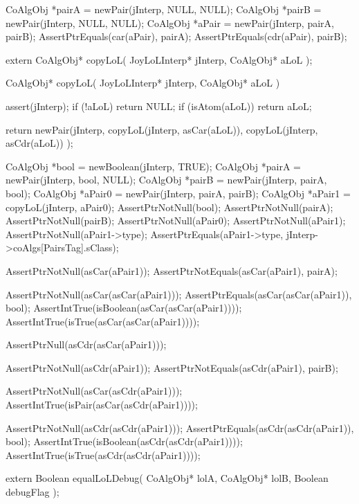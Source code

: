 \startCTest
  CoAlgObj *pairA = newPair(jInterp, NULL, NULL);
  CoAlgObj *pairB = newPair(jInterp, NULL, NULL);
  CoAlgObj *aPair = newPair(jInterp, pairA, pairB);
  AssertPtrEquals(car(aPair), pairA);
  AssertPtrEquals(cdr(aPair), pairB);
\stopCTest
\stopTestCase
\stopTestSuite

\startTestSuite[copyLoL]

\startCHeader
extern CoAlgObj* copyLoL(
  JoyLoLInterp* jInterp,
  CoAlgObj* aLoL
);
\stopCHeader

\startCCode
CoAlgObj* copyLoL(
  JoyLoLInterp* jInterp,
  CoAlgObj* aLoL
) {
  assert(jInterp);
  if (!aLoL) return NULL;
  if (isAtom(aLoL)) return aLoL;

  return newPair(jInterp,
                 copyLoL(jInterp, asCar(aLoL)),
                 copyLoL(jInterp, asCdr(aLoL))
                 );
}
\stopCCode


\startCTest
  CoAlgObj *bool   = newBoolean(jInterp, TRUE);
  CoAlgObj *pairA  = newPair(jInterp, bool, NULL);
  CoAlgObj *pairB  = newPair(jInterp, pairA, bool);
  CoAlgObj *aPair0 = newPair(jInterp, pairA, pairB);
  CoAlgObj *aPair1 = copyLoL(jInterp, aPair0);
  AssertPtrNotNull(bool);
  AssertPtrNotNull(pairA);
  AssertPtrNotNull(pairB);
  AssertPtrNotNull(aPair0);
  AssertPtrNotNull(aPair1);
  AssertPtrNotNull(aPair1->type);
  AssertPtrEquals(aPair1->type, jInterp->coAlgs[PairsTag].sClass);

  AssertPtrNotNull(asCar(aPair1));
  AssertPtrNotEquals(asCar(aPair1), pairA);

  AssertPtrNotNull(asCar(asCar(aPair1)));
  AssertPtrEquals(asCar(asCar(aPair1)), bool);
  AssertIntTrue(isBoolean(asCar(asCar(aPair1))));
  AssertIntTrue(isTrue(asCar(asCar(aPair1))));

  AssertPtrNull(asCdr(asCar(aPair1)));

  AssertPtrNotNull(asCdr(aPair1));
  AssertPtrNotEquals(asCdr(aPair1), pairB);

  AssertPtrNotNull(asCar(asCdr(aPair1)));
  AssertIntTrue(isPair(asCar(asCdr(aPair1))));

  AssertPtrNotNull(asCdr(asCdr(aPair1)));
  AssertPtrEquals(asCdr(asCdr(aPair1)), bool);
  AssertIntTrue(isBoolean(asCdr(asCdr(aPair1))));
  AssertIntTrue(isTrue(asCdr(asCdr(aPair1))));
\stopCTest
\stopTestCase
\stopTestSuite

\startTestSuite[equalLoL]

\startCHeader
extern Boolean equalLoLDebug(
  CoAlgObj* lolA,
  CoAlgObj* lolB,
  Boolean debugFlag
);

